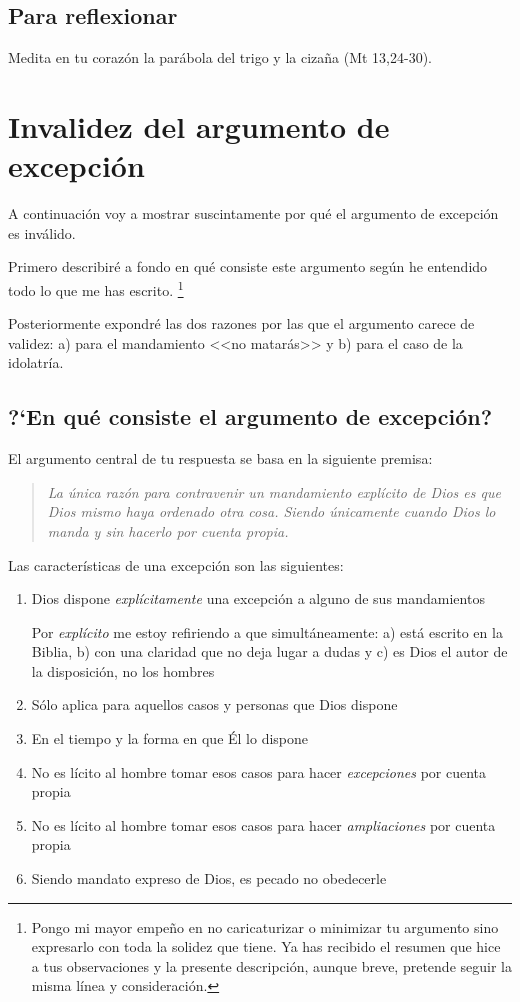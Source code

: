 \documentclass{article}
\begin{document}
\subsection{Para reflexionar}

Medita en tu coraz\'on la par\'abola del trigo y la ciza\~na (Mt 13,24-30).

\section{Invalidez del argumento de excepci\'on}

A continuaci\'on voy a mostrar suscintamente por qu\'e el argumento de excepci\'on es inv\'alido. 

Primero describir\'e a fondo en qu\'e consiste este argumento seg\'un he entendido todo lo que me has escrito.%
    \footnote{Pongo mi mayor empe\~no en no caricaturizar o minimizar tu argumento sino expresarlo con toda la solidez que tiene. Ya has recibido el resumen que hice a tus observaciones y la presente descripci\'on, aunque breve, pretende seguir la misma l\'{i}nea y consideraci\'on.}

Posteriormente expondr\'e las dos razones por las que el argumento carece de validez: a) para el mandamiento <<no matar\'as>> y b) para el caso de la idolatr\'{i}a.

\subsection{?`En qu\'e consiste el argumento de excepci\'on?}

El argumento central de tu respuesta se basa en la siguiente premisa:

\begin{quote}
\emph{La \'unica raz\'on para contravenir un mandamiento expl\'{i}cito de Dios es que Dios mismo haya ordenado otra cosa. Siendo \'unicamente cuando Dios lo manda y sin hacerlo por cuenta propia.}
\end{quote}

\noindent
Las caracter\'{i}sticas de una excepci\'on son las siguientes:

\begin{enumerate}
\item Dios dispone \emph{expl\'{i}citamente} una excepci\'on a alguno de sus mandamientos
    
    Por \emph{expl\'{i}cito} me estoy refiriendo a que simult\'aneamente: a) est\'a escrito en la Biblia, b) con una claridad que no deja lugar a dudas y c) es Dios el autor de la disposici\'on, no los hombres

\item S\'olo aplica para aquellos casos y personas que Dios dispone
\item En el tiempo y la forma en que \'El lo dispone
\item No es l\'{i}cito al hombre tomar esos casos para hacer \emph{excepciones} por cuenta propia
\item No es l\'{i}cito al hombre tomar esos casos para hacer \emph{ampliaciones} por cuenta propia
\item Siendo mandato expreso de Dios, es pecado no obedecerle
\end{enumerate}
\end{document}

